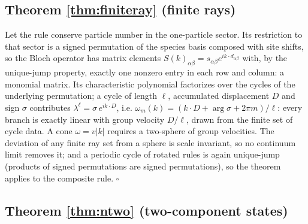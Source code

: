 \documentclass[aps,prd,twocolumn,superscriptaddress,nofootinbib,floatfix]{revtex4-2}
\begin{document}
\subsection{Theorem \ref{thm:finiteray} (finite rays)}

Let the rule conserve particle number in the one-particle sector. Its
restriction to that sector is a signed permutation of the species basis
composed with site shifts, so the Bloch operator has matrix elements
$S(k)_{\alpha\beta}=s_{\alpha\beta}e^{ik\cdot d_{\alpha\beta}}$ with, by
the unique-jump property, exactly one nonzero entry in each row and column:
a monomial matrix. Its characteristic polynomial factorizes over the cycles
of the underlying permutation; a cycle of length $\ell$, accumulated
displacement $D$ and sign $\sigma$ contributes
$\lambda^\ell=\sigma\,e^{ik\cdot D}$, i.e.
$\omega_m(k)=(k\cdot D+\arg\sigma+2\pi m)/\ell$: every branch is exactly
linear with group velocity $D/\ell$, drawn from the finite set of cycle
data. A cone $\omega=v|k|$ requires a two-sphere of group velocities. The
deviation of any finite ray set from a sphere is scale invariant, so no
continuum limit removes it; and a periodic cycle of rotated rules is again
unique-jump (products of signed permutations are signed permutations), so
the theorem applies to the composite rule. \hfill$\square$

\subsection{Theorem \ref{thm:ntwo} (two-component states)}
\end{document}
